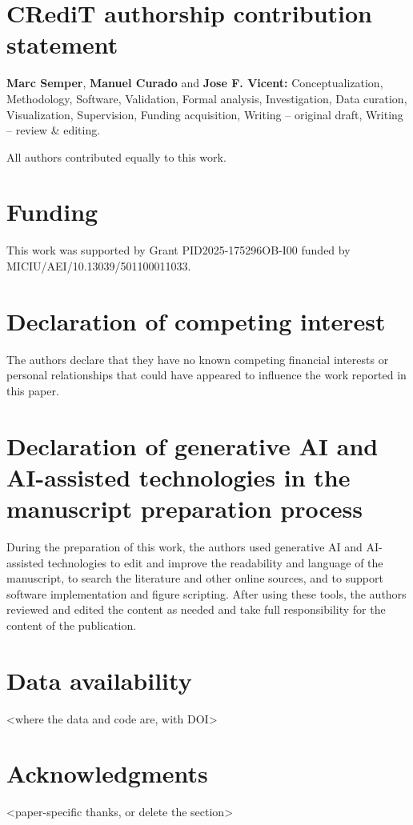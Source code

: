 \section*{CRediT authorship contribution statement}
\textbf{Marc Semper}, \textbf{Manuel Curado} and \textbf{Jose F.
Vicent:} Conceptualization, Methodology, Software, Validation, Formal analysis,
Investigation, Data curation, Visualization, Supervision, Funding acquisition,
Writing -- original draft, Writing -- review \& editing.

All authors contributed equally to this work.

\section*{Funding}
This work was supported by Grant PID2025-175296OB-I00 funded by
MICIU/AEI/10.13039/501100011033.

\section*{Declaration of competing interest}
The authors declare that they have no known competing financial interests or
personal relationships that could have appeared to influence the work reported
in this paper.

\section*{Declaration of generative AI and AI-assisted technologies in the
manuscript preparation process}
During the preparation of this work, the authors used generative AI and
AI-assisted technologies to edit and improve the readability and language of the
manuscript, to search the literature and other online sources, and to support
software implementation and figure scripting. After using these tools, the
authors reviewed and edited the content as needed and take full responsibility
for the content of the publication.

\section*{Data availability}
<where the data and code are, with DOI>

\section*{Acknowledgments}
<paper-specific thanks, or delete the section>
